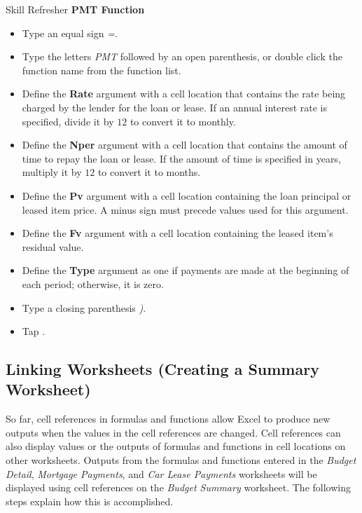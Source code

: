 \begin{center}
	\begin{sklbox}{Skill Refresher}
		\textbf{PMT Function}
		\\
		\begin{itemize}
			\setlength{\itemsep}{0pt}
			\setlength{\parskip}{0pt}
			\setlength{\parsep}{0pt}
			
			\item Type an equal sign \textit{=}.
			\item Type the letters \textit{PMT} followed by an open parenthesis, or double click the function name from the function list.
			\item Define the \textbf{Rate} argument with a cell location that contains the rate being charged by the lender for the loan or lease. If an annual interest rate is specified, divide it by $ 12 $ to convert it to monthly.
			\item Define the \textbf{Nper} argument with a cell location that contains the amount of time to repay the loan or lease. If the amount of time is specified in years, multiply it by $ 12 $ to convert it to months.
			\item Define the \textbf{Pv} argument with a cell location containing the loan principal or leased item price. A minus sign must precede values used for this argument.
			\item Define the \textbf{Fv} argument with a cell location containing the leased item's residual value.
			\item Define the \textbf{Type} argument as one if payments are made at the beginning of each period; otherwise, it is zero.
			\item Type a closing parenthesis \textit{)}.
			\item Tap .
			
		\end{itemize}
	\end{sklbox}
\end{center}

\subsection{Linking Worksheets (Creating a Summary Worksheet)}

So far, cell references in formulas and functions allow Excel to produce new outputs when the values in the cell references are changed. Cell references can also display values or the outputs of formulas and functions in cell locations on other worksheets. Outputs from the formulas and functions entered in the \textit{Budget Detail}, \textit{Mortgage Payments}, and \textit{Car Lease Payments} worksheets will be displayed using cell references on the \textit{Budget Summary} worksheet. The following steps explain how this is accomplished.

